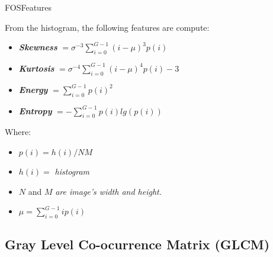 \documentclass[10pt]{beamer}
\newcommand{\1}{
	\setbeamertemplate{background}{
		\texttt{[image: img/1]}
		\tikz[overlay] \fill[fill opacity=0.75,fill=white] (0,0) rectangle (-\paperwidth,\paperheight);
	}
}
\begin{document}
\begin{frame}{FOS}{Features}
	\begin{block}{}
		From the histogram, the following features are compute:
		\begin{itemize}
			\item \textbf{\textit{Skewness}} $ = \sigma^{-3} \sum_{i=0}^{G-1} (i - \mu)^3 p(i)$
			\item \textbf{\textit{Kurtosis}} $ = \sigma^{-4} \sum_{i=0}^{G-1} (i - \mu)^4 p(i)-3$
			\item \textbf{\textit{Energy}} $ = \sum_{i=0}^{G-1} p(i)^2$
			\item \textbf{\textit{Entropy}} $ = -\sum_{i=0}^{G-1} p(i)lg(p(i))$
		\end{itemize}
	\end{block}
	
	\begin{block}{}
		Where: 
		\begin{itemize}	
			\item	$p(i) = h(i)/NM$ 
			\item	$h(i) =$ \textit{histogram} 
			\item	$N$ and $M$ \textit{are image's width and height.} 
			\item	$\mu = \sum_{i=0}^{G-1}ip(i)$
		\end{itemize}
	\end{block}
\end{frame}

\subsection{Gray Level Co-ocurrence Matrix (GLCM)} \label{section:glcm}
\end{document}
